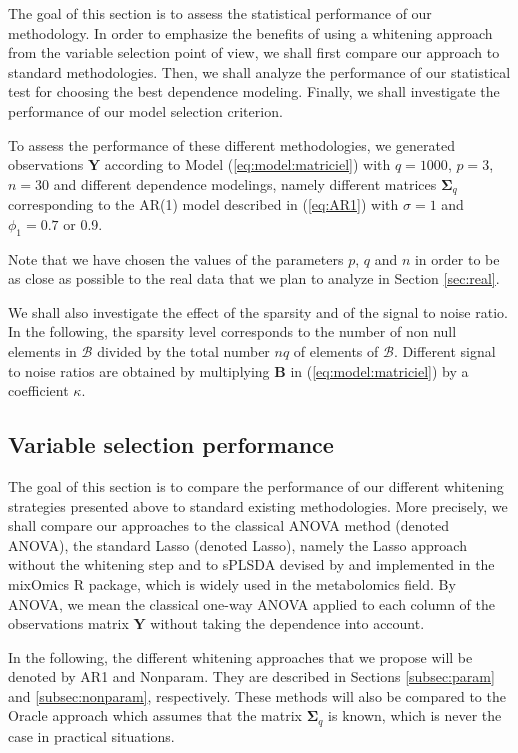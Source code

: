 The goal of this section is to assess the statistical performance of
our methodology. In order to emphasize the benefits of using a
whitening approach from the variable selection point of view, we shall
first compare our approach to standard methodologies. Then, we shall analyze the performance
of our statistical test for choosing the best dependence
modeling. Finally, we shall investigate the performance of our model
selection criterion.

To assess the performance of
these different methodologies, we generated observations
$\boldsymbol{Y}$ according to Model (\ref{eq:model:matriciel}) with $q=1000$,
$p=3$, $n=30$ and different dependence modelings, namely different
matrices $\boldsymbol{\Sigma}_q$ corresponding to the AR(1) model
described in (\ref{eq:AR1}) with $\sigma=1$ and $\phi_1=0.7$ or 0.9.

Note that we have chosen the values of the parameters $p$, $q$ and $n$
in order to be as close as possible to the real data that we plan to analyze in
Section \ref{sec:real}.

We shall also investigate the effect of the sparsity and of the signal
to noise ratio. In the following, the sparsity level 
corresponds to the number of non null elements in $\mathcal{B}$
divided by the total number $nq$ of elements of $\mathcal{B}$. Different signal to noise ratios are
obtained by multiplying $\boldsymbol{B}$ in (\ref{eq:model:matriciel})
by a coefficient $\kappa$. 


\subsection{Variable selection performance}

The goal of this section is to compare
the performance of our different whitening strategies presented above to standard existing methodologies.
More precisely, we shall compare our approaches to the classical
ANOVA method (denoted \textsf{ANOVA}), the standard Lasso
(denoted \textsf{Lasso}), namely the Lasso approach without
the whitening step and to \textsf{sPLSDA} devised by \cite{LeCao2011} and implemented in the \textsf{mixOmics} R package, which is widely used in the metabolomics field. 
By \textsf{ANOVA}, we mean the classical one-way ANOVA applied to each column of the observations matrix $\boldsymbol{Y}$
without taking the dependence into account. 

In the following, the different whitening
approaches that we propose will be denoted by \textsf{AR1} and
\textsf{Nonparam}. They are described in Sections
\ref{subsec:param} and \ref{subsec:nonparam}, respectively. These methods will also be
compared to the \textsf{Oracle} approach which assumes that the matrix
$\boldsymbol{\Sigma}_q$ is known, which is never the case in practical
situations. 

